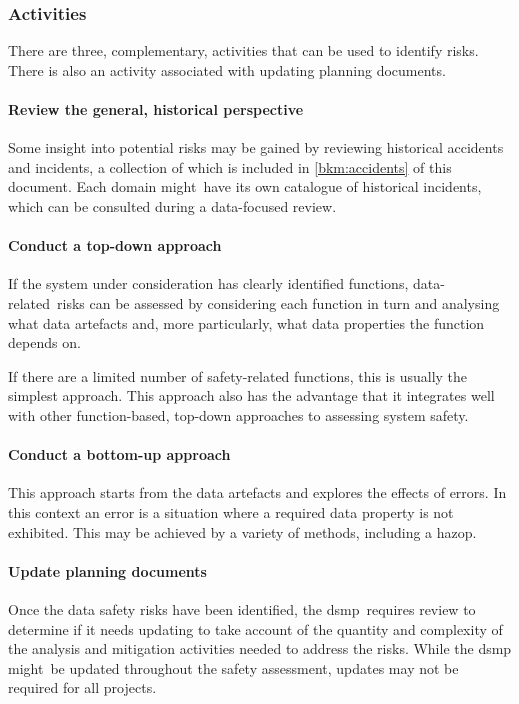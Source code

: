 \subsubsection{Activities}
There are three, complementary, activities that can be used to identify risks. There is also an activity associated with updating planning documents.

\paragraph{Review the general, historical perspective}
Some insight into potential risks may be gained by reviewing historical accidents and incidents, a collection of which is included in
\autoref{bkm:accidents} of this \cbstart document. Each domain might\cbend\ have its own catalogue of historical incidents, which can be consulted during a data-focused review.

\paragraph{Conduct a top-down approach}
If the system under consideration has clearly identified functions\cbstart, data-related\cbend\ risks can be assessed by considering each function in turn and analysing what \glspl{data artefact} and, more particularly, what data properties the function depends on.

If there are a limited number of safety-related functions, this is usually the simplest approach. This approach also has the advantage that it integrates well with other function-based, top-down approaches to assessing system safety. 

\paragraph{Conduct a bottom-up approach}
This approach starts from the \glspl{data artefact} and explores the effects of \glspl{error}. In this context an error is a situation where a required \gls{data property} is not exhibited. This may be achieved by a variety of methods, including a \gls{hazop}.

\paragraph{Update planning documents}
Once the data safety risks have been identified, the \cbstart\gls{dsmp}\cbend\ requires review to determine if it needs
updating to take account of the quantity and complexity of the analysis and \gls{mitigation} activities needed to address the risks. While the \gls{dsmp} \cbstart might\cbend\ be updated throughout the \gls{safety assessment}, updates may not be required for all projects.

